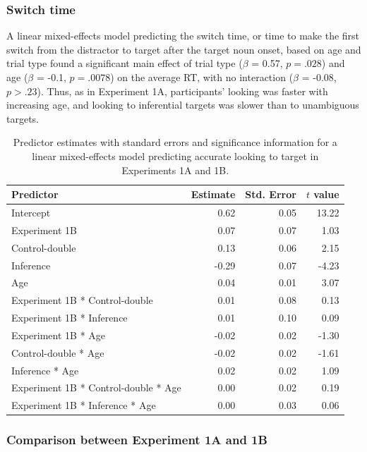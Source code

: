 \documentclass[a4paper,man,apacite,floatsintext]{apa6}
\begin{document}
\subsubsection{Switch time}\label{switch-time-1}

A linear mixed-effects model predicting the switch time, or time to make
the first switch from the distractor to target after the target noun
onset, based on age and trial type found a significant main effect of
trial type (\(\beta\) = 0.57, \(p =.028\)) and age (\(\beta\) = -0.1,
\(p =.0078\)) on the average RT, with no interaction (\(\beta\) = -0.08,
\(p >.23\)). Thus, as in Experiment 1A, participants' looking was faster
with increasing age, and looking to inferential targets was slower than
to unambiguous targets.

\begin{table}[tb]
\centering
\begin{tabular}{lrrr}
 Predictor & Estimate & Std. Error & $t$ value \\ 
  \hline
Intercept & 0.62 & 0.05 & 13.22 \\ 
  Experiment 1B & 0.07 & 0.07 & 1.03 \\ 
  Control-double & 0.13 & 0.06 & 2.15 \\ 
  Inference & -0.29 & 0.07 & -4.23 \\ 
  Age & 0.04 & 0.01 & 3.07 \\ 
  Experiment 1B * Control-double & 0.01 & 0.08 & 0.13 \\ 
  Experiment 1B * Inference & 0.01 & 0.10 & 0.09 \\ 
  Experiment 1B * Age & -0.02 & 0.02 & -1.30 \\ 
  Control-double * Age & -0.02 & 0.02 & -1.61 \\ 
  Inference * Age & 0.02 & 0.02 & 1.09 \\ 
  Experiment 1B * Control-double * Age & 0.00 & 0.02 & 0.19 \\ 
  Experiment 1B * Inference * Age & 0.00 & 0.03 & 0.06 \\ 
   \hline
\end{tabular}
\caption{Predictor estimates with standard errors and significance information for a linear mixed-effects model predicting accurate looking to target in Experiments 1A and 1B.} 
\label{tab:exp2_tab}
\end{table}

\subsubsection{Comparison between Experiment 1A and
1B}\label{comparison-between-experiment-1a-and-1b}
\end{document}
